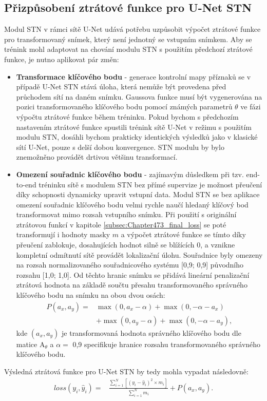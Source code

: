 \subsection{Přizpůsobení ztrátové funkce pro U-Net STN}
\label{subsec:Chapter474_stn_loss}

Modul STN v rámci sítě U-Net udává potřebu uzpůsobit výpočet ztrátové funkce pro transformovaný snímek, který není jednotný se vstupním snímkem. Aby se trénink mohl adaptovat na chování modulu STN s použitím předchozí ztrátové funkce, je nutno aplikovat pár změn:
\begin{itemize}
    \item \textbf{Transformace klíčového bodu} - generace kontrolní mapy příznaků se v případě U-Net STN stává úloha, která nemůže být provedena před průchodem sítí na daném snímku. Gaussova funkce musí být vygenerována na pozici transformovaného klíčového bodu pomocí známých parametrů $\theta$ ve fázi výpočtu ztrátové funkce během tréninku. Pokud bychom s předchozím nastavením ztrátové funkce spustili trénink sítě U-Net v režimu s použitím modulu STN, dosáhli bychom prakticky identických výsledků jako v klasické sítí U-Net, pouze s delší dobou konvergence. STN modulu by bylo znemožněno provádět drtivou většinu transformací.
    \item \textbf{Omezení souřadnic klíčového bodu} - zajímavým důsledkem při tzv. end-to-end tréninku sítě s modulem STN bez přímé supervize je možnost přeučení díky schopnosti dynamicky upravit vstupní data. Modul STN se bez aplikace omezení souřadnic klíčového bodu velmi rychle naučí hledaný klíčový bod transformovat mimo rozsah vstupního snímku. Při použití s originální ztrátovou funkcí v kapitole \ref{subsec:Chapter473_final_loss} se poté transformují i hodnoty masky $m$ a výpočet ztrátové funkce se tímto díky přeučení zablokuje, dosahujících hodnot silně se blížících 0, a vznikne kompletní odmítnutí sítě provádět lokalizační úlohu. Souřadnice byly omezeny na rozsah normalizovaného souřadnicového systému [0,9; 0,9] původního rozsahu [1,0; 1,0]. Od těchto hranic snímku se přidává lineární penalizační ztrátová hodnota na základě součtu přesahu transformovaného správného klíčového bodu na snímku na obou dvou osách:
    \begin{equation}
    \begin{aligned}
    P(a_x, a_y) = & \max(0, a_x - \alpha) + \max(0, -\alpha - a_x) \\
                  & + \max(0, a_y - \alpha) + \max(0, -\alpha - a_y),
    \end{aligned}
    \end{equation}
    kde $(a_x, a_y)$ je transformovaná hodnota správného klíčového bodu dle matice ${\displaystyle \mathrm {A} }_\theta$ a $\alpha =$ 0,9 specifikuje hranice rozsahu transformovaného správného klíčového bodu.
    
\end{itemize}

Výsledná ztrátová funkce pro U-Net STN by tedy mohla vypadat následovně:
\begin{equation}
\begin{aligned}
loss(y_i, \hat{y}_i) = & \frac{\sum_{i=1}^{N} [(y_i - \hat{y}_i)^2\times m_i]}{\sum_{i=1}^{N} m_i} + P(a_x, a_y).
\end{aligned}
\end{equation}

\endinput